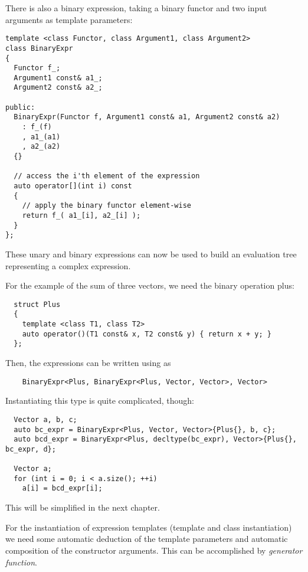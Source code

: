 There is also a binary expression, taking a binary functor and two input arguments as template parameters:
%
\begin{verbatim}
template <class Functor, class Argument1, class Argument2>
class BinaryExpr
{
  Functor f_;
  Argument1 const& a1_;
  Argument2 const& a2_;

public:
  BinaryExpr(Functor f, Argument1 const& a1, Argument2 const& a2)
    : f_(f)
    , a1_(a1)
    , a2_(a2)
  {}

  // access the i'th element of the expression
  auto operator[](int i) const
  {
    // apply the binary functor element-wise
    return f_( a1_[i], a2_[i] );
  }
};
\end{verbatim}


These unary and binary expressions can now be used to build an evaluation tree representing a complex expression.

\begin{example}
  For the example of the sum of three vectors, we need the binary operation plus:
  \begin{verbatim}
  struct Plus
  {
    template <class T1, class T2>
    auto operator()(T1 const& x, T2 const& y) { return x + y; }
  };
  \end{verbatim}

  Then, the expressions  can be written using  as
  \begin{verbatim}
    BinaryExpr<Plus, BinaryExpr<Plus, Vector, Vector>, Vector>
  \end{verbatim}

  Instantiating this type is quite complicated, though:
  \begin{verbatim}
  Vector a, b, c;
  auto bc_expr = BinaryExpr<Plus, Vector, Vector>{Plus{}, b, c};
  auto bcd_expr = BinaryExpr<Plus, decltype(bc_expr), Vector>{Plus{}, bc_expr, d};

  Vector a;
  for (int i = 0; i < a.size(); ++i)
    a[i] = bcd_expr[i];
  \end{verbatim}
  This will be simplified in the next chapter.
\end{example}

For the instantiation of expression templates (template and class instantiation) we need some automatic deduction of the
template parameters and automatic composition of the constructor arguments. This can be accomplished by \emph{generator function}.


